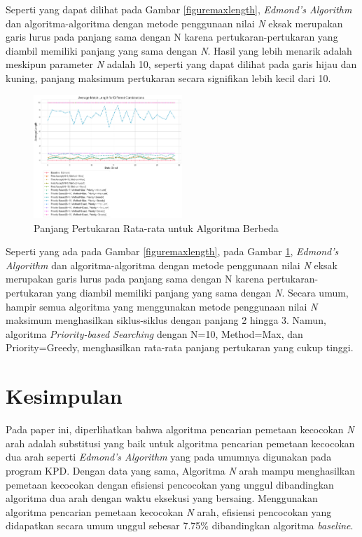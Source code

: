 \documentclass[conference]{IEEEtran}
\begin{document}
Seperti yang dapat dilihat pada Gambar \ref{figuremaxlength}, \textit{Edmond's Algorithm} dan algoritma-algoritma dengan metode
penggunaan nilai \textit{N} eksak merupakan garis lurus pada panjang sama dengan N karena pertukaran-pertukaran yang diambil memiliki
panjang yang sama dengan \textit{N}. Hasil yang lebih menarik adalah meskipun parameter \textit{N} adalah 10, seperti yang dapat
dilihat pada garis hijau dan kuning, panjang maksimum pertukaran secara signifikan lebih kecil dari 10.

\begin{figure}[h]
    \includegraphics[width=0.5\textwidth]{images/average_match_length_for_different_combinations.png}
    \caption{Panjang Pertukaran Rata-rata untuk Algoritma Berbeda}
    \label{figureavglength}
\end{figure}

Seperti yang ada pada Gambar \ref{figuremaxlength}, pada Gambar \ref{figureavglength}, \textit{Edmond's Algorithm} dan algoritma-algoritma
dengan metode penggunaan nilai \textit{N} eksak merupakan garis lurus pada panjang sama dengan N karena pertukaran-pertukaran yang diambil
memiliki panjang yang sama dengan \textit{N}. Secara umum, hampir semua algoritma yang menggunakan metode penggunaan nilai \textit{N} maksimum
menghasilkan siklus-siklus dengan panjang 2 hingga 3. Namun, algoritma \textit{Priority-based Searching} dengan N=10, Method=Max, dan
Priority=Greedy, menghasilkan rata-rata panjang pertukaran yang cukup tinggi.

\section{Kesimpulan}
Pada paper ini, diperlihatkan bahwa algoritma pencarian pemetaan kecocokan \textit{N} arah adalah substitusi yang baik untuk algoritma
pencarian pemetaan kecocokan dua arah seperti \textit{Edmond's Algorithm} yang pada umumnya digunakan pada program KPD. Dengan data yang
sama, Algoritma \textit{N} arah mampu menghasilkan pemetaan kecocokan dengan efisiensi pencocokan yang unggul dibandingkan algoritma
dua arah dengan waktu eksekusi yang bersaing. Menggunakan algoritma pencarian pemetaan kecocokan \textit{N} arah, efisiensi pencocokan
yang didapatkan secara umum unggul sebesar 7.75\% dibandingkan algoritma \textit{baseline}.
\end{document}
